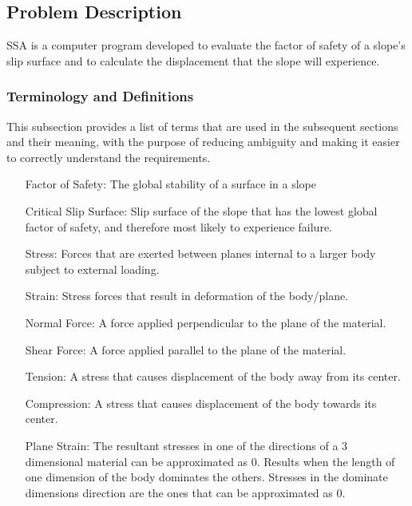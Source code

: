 \documentclass[12pt]{article}
\begin{document}
\subsection{Problem Description}
\label{Sec:ProbDesc}
SSA is a computer program developed to evaluate the factor of safety of a slope's slip surface and to calculate the displacement that the slope will experience.
\subsubsection{Terminology and Definitions}
\label{Sec:TermDefs}
This subsection provides a list of terms that are used in the subsequent sections and their meaning, with the purpose of reducing ambiguity and making it easier to correctly understand the requirements.
\begin{itemize}
\item[Factor of Safety:]The global stability of a surface in a slope
\item[Critical Slip Surface:]Slip surface of the slope that has the lowest global factor of safety, and therefore most likely to experience failure.
\item[Stress:]Forces that are exerted between planes internal to a larger body subject to external loading.
\item[Strain:]Stress forces that result in deformation of the body/plane.
\item[Normal Force:]A force applied perpendicular to the plane of the material.
\item[Shear Force:]A force applied parallel to the plane of the material.
\item[Tension:]A stress that causes displacement of the body away from its center.
\item[Compression:]A stress that causes displacement of the body towards its center.
\item[Plane Strain:]The resultant stresses in one of the directions of a 3 dimensional material can be approximated as 0. Results when the length of one dimension of the body dominates the others. Stresses in the dominate dimensions direction are the ones that can be approximated as 0.
\end{itemize}
\end{document}
